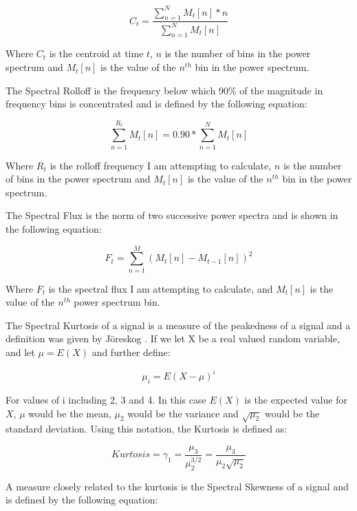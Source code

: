 \documentclass[12pt,oneside]{book}
\begin{document}
\begin{equation} 
C_t = \frac{\sum_{n=1}^N M_t[n] * n}{\sum_{n=1}^N M_t[n]} 
\end{equation}

\noindent Where $C_t$ is the centroid at time $t$, $n$ is the number of bins in
the power spectrum and $M_t[n]$ is the value of the $n^{th}$ bin in
the power spectrum.

The Spectral Rolloff is the frequency below which 90\% of the magnitude in
frequency bins is concentrated and is defined by the following
equation:

\begin{equation} 
\sum_{n=1}^{R_t} M_t[n] = 0.90 * \sum_{n=1}^N M_t[n] 
\end{equation}

\noindent Where $R_t$ is the rolloff frequency I am attempting to calculate,
$n$ is the number of bins in the power spectrum and $M_t[n]$ is the
value of the $n^{th}$ bin in the power spectrum.

The Spectral Flux is the norm of two successive power
spectra and is shown in the following equation:

\begin{equation} 
F_t = \sum_{n=1}^M (M_t[n] - M_{t-1}[n])^2 
\end{equation}

\noindent Where $F_t$ is the spectral flux I am attempting to calculate,
and $M_t[n]$ is the value of the $n^{th}$ power spectrum bin.

The Spectral Kurtosis of a signal \cite{dubnov1996testing} is a
measure of the peakedness of a signal and a definition was given by
J{\"o}reskog \cite{joreskog1999formulas}.  If we let X be
a real valued random variable, and let $\mu = E(X)$ and further
define:

\begin{equation} 
\mu_i = E(X - \mu)^i 
\end{equation}

\noindent For values of i including 2, 3 and 4.  In this case $E(X)$ is the
expected value for $X$, $\mu$ would be the mean, $\mu_2$ would be the
variance and $\sqrt{\mu_2}$ would be the standard deviation.  Using
this notation, the Kurtosis is defined as:

\begin{equation} 
Kurtosis = \gamma_1 = \frac{\mu_3}{\mu_2^{3/2}} = \frac{\mu_3}{\mu_2 \sqrt{\mu_2}} 
\end{equation}

\noindent A measure closely related to the kurtosis is the Spectral Skewness of
a signal and is defined by the following equation:
\end{document}

